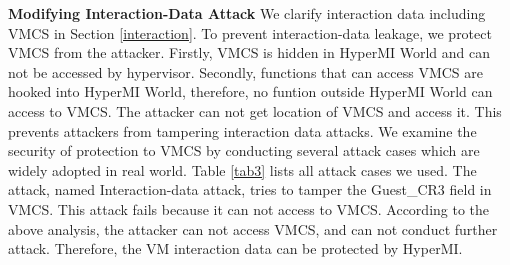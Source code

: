 \documentclass[conference]{IEEEtran}
\begin{document}


\textbf{Modifying Interaction-Data Attack}
We clarify interaction data including VMCS in Section \ref{interaction}.
 To prevent interaction-data leakage, we protect VMCS from the attacker. Firstly, VMCS is hidden in HyperMI World and can not be accessed by hypervisor. Secondly, functions that can access VMCS are hooked into HyperMI World, therefore, no funtion outside HyperMI World can access to VMCS. The attacker can not get location of VMCS and access it. This prevents attackers from tampering interaction data attacks. We examine the security of protection to VMCS by conducting several attack cases which are widely adopted in real world. Table \ref{tab3} lists all attack cases we used. The attack, named Interaction-data attack, tries to tamper the Guest\_CR3 field in VMCS. This attack fails because it can not access to VMCS. 
  According to the above analysis, the attacker can not access VMCS, and can not conduct further attack. Therefore, the VM interaction data can be protected by HyperMI.


\end{document}
